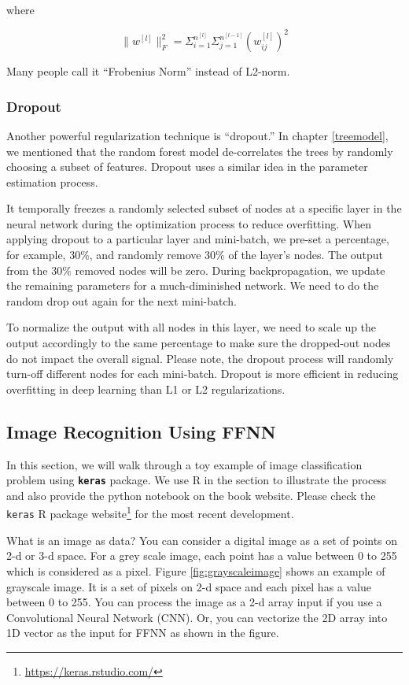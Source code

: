 \documentclass[
  12pt,
]{krantz}
\renewcommand{\href}[2]{#2\footnote{\url{#1}}}
\begin{document}
where

\[\parallel w^{[l]} \parallel^2_F = \Sigma_{i=1}^{n^{[l]}}\Sigma_{j=1}^{n^{[l-1]}} (w^{[l]}_{ij})^2\]

Many people call it ``Frobenius Norm'' instead of L2-norm.

\hypertarget{dropout}{%
\subsubsection{Dropout}\label{dropout}}

Another powerful regularization technique is ``dropout.'' In chapter \ref{treemodel}, we mentioned that the random forest model de-correlates the trees by randomly choosing a subset of features. Dropout uses a similar idea in the parameter estimation process.

It temporally freezes a randomly selected subset of nodes at a specific layer in the neural network during the optimization process to reduce overfitting. When applying dropout to a particular layer and mini-batch, we pre-set a percentage, for example, 30\%, and randomly remove 30\% of the layer's nodes. The output from the 30\% removed nodes will be zero. During backpropagation, we update the remaining parameters for a much-diminished network. We need to do the random drop out again for the next mini-batch.

To normalize the output with all nodes in this layer, we need to scale up the output accordingly to the same percentage to make sure the dropped-out nodes do not impact the overall signal. Please note, the dropout process will randomly turn-off different nodes for each mini-batch. Dropout is more efficient in reducing overfitting in deep learning than L1 or L2 regularizations.

\hypertarget{ffnnexample}{%
\subsection{Image Recognition Using FFNN}\label{ffnnexample}}

In this section, we will walk through a toy example of image classification problem using \textbf{\texttt{keras}} package. We use R in the section to illustrate the process and also provide the python notebook on the book website. Please check the \href{https://keras.rstudio.com/}{\texttt{keras} R package website} for the most recent development.

What is an image as data? You can consider a digital image as a set of points on 2-d or 3-d space. For a grey scale image, each point has a value between 0 to 255 which is considered as a pixel. Figure \ref{fig:grayscaleimage} shows an example of grayscale image. It is a set of pixels on 2-d space and each pixel has a value between 0 to 255. You can process the image as a 2-d array input if you use a Convolutional Neural Network (CNN). Or, you can vectorize the 2D array into 1D vector as the input for FFNN as shown in the figure.
\end{document}
